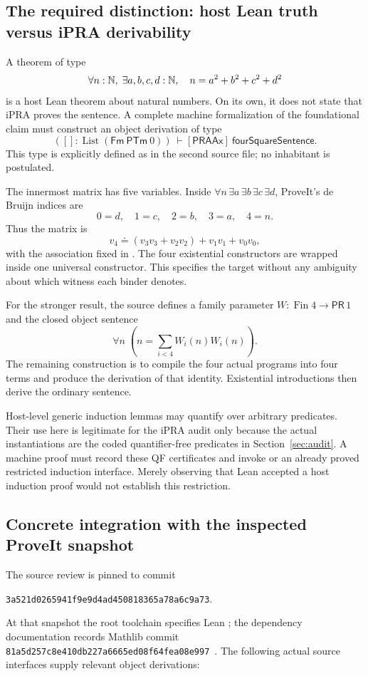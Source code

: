 \subsection{The required distinction: host Lean truth versus iPRA derivability}

A theorem of type
\[
 \forall n:\mathbb N,\;\exists a,b,c,d:\mathbb N,\quad n=a^2+b^2+c^2+d^2
\]
is a host Lean theorem about natural numbers. On its own, it does not
state that iPRA proves the sentence. A complete machine formalization of
the foundational claim must construct an object derivation of type
\[
 ([]:\operatorname{List}(\mathsf{Fm}\ \mathsf{PTm}\ 0))
 \ \vdash[\mathsf{PRAAx}]\ \mathsf{fourSquareSentence}.
\]
This type is explicitly defined as  in the
second source file; no inhabitant is postulated.

The innermost matrix has five variables. Inside
$\forall n\,\exists a\,\exists b\,\exists c\,\exists d$, ProveIt's
de Bruijn indices are
\[
 0=d,\quad1=c,\quad2=b,\quad3=a,\quad4=n.
\]
Thus the matrix is
\[
 v_4\doteq(v_3v_3+v_2v_2)+v_1v_1+v_0v_0,
\]
with the association fixed in . The four existential
constructors are wrapped inside one universal constructor. This specifies
the target without any ambiguity about which witness each binder denotes.

For the stronger result, the source defines a family parameter
$W:\operatorname{Fin}4\to\mathsf{PR}\,1$ and the closed object sentence
\[
 \forall n\;\left(n=\sum_{i<4}W_i(n)W_i(n)\right).
\]
The remaining construction is to compile the four actual programs into
four  terms and produce the derivation of that identity.
Existential introductions then derive the ordinary sentence.

Host-level generic induction lemmas may quantify over arbitrary predicates.
Their use here is legitimate for the iPRA audit only because the actual
instantiations are the coded quantifier-free predicates in
Section~\ref{sec:audit}. A machine proof must record these QF certificates
and invoke  or an already proved restricted induction
interface. Merely observing that Lean accepted a host induction proof
would not establish this restriction.

\subsection{Concrete integration with the inspected ProveIt snapshot}

The source review is pinned to commit
\begin{center}
\texttt{3a521d0265941f9e9d4ad450818365a78a6c9a73}.
\end{center}
At that snapshot the root toolchain specifies Lean ;
the dependency documentation records Mathlib commit
\texttt{81a5d257c8e410db227a6665ed08f64fea08e997}~\cite{proveit}.
The following actual source interfaces supply relevant object derivations:

